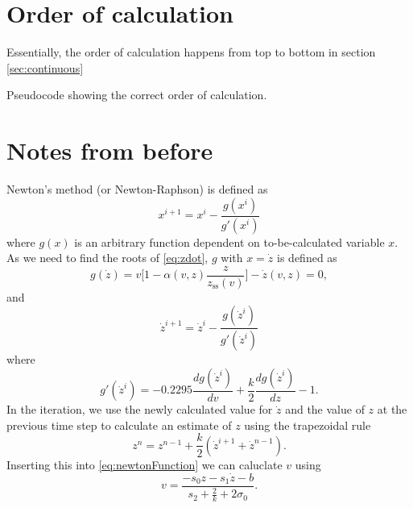 \documentclass{article}
\begin{document}
\section{Order of calculation}
Essentially, the order of calculation happens from top to bottom in section \ref{sec:continuous}
\begin{algorithm}[h]\label{alg:calcOrder}
 \caption{Pseudocode showing the correct order of calculation.}
\end{algorithm}

\section{Notes from before}
Newton's method (or Newton-Raphson) is defined as
\begin{equation}
    x^{i+1} = x^{i} - \frac{g(x^i)}{g'(x^i)}
\end{equation}
where $g(x)$ is an arbitrary function dependent on to-be-calculated variable $x$.
As we need to find the roots of \eqref{eq:zdot}, $g$ with $x=\dot z$ is defined as
\begin{equation}
   g(\dot z) = v\bigg[1-\alpha(v, z)\frac{z}{z_\text{ss}(v)}\bigg] -  \dot z(v,z) = 0,
\end{equation}
and
\begin{equation}
    \dot z^{i+1} = \dot z^i - \frac{g(\dot z^i)}{g'(\dot z^i)}
\end{equation}
where
\begin{equation}
    g'(\dot z^i) = -0.2295\frac{dg(\dot z^i)}{dv} + \frac{k}{2}\frac{dg(\dot z^i)}{dz} - 1.
\end{equation}
In the iteration, we use the newly calculated value for $\dot z$ and the value of $z$ at the previous time step to calculate an estimate of $z$ using the trapezoidal rule
\begin{equation}
    z^n = z^{n-1} + \frac{k}{2}(\dot z^{i+1} + \dot z^{n-1}).
\end{equation}
Inserting this into \eqref{eq:newtonFunction} we can caluclate $v$ using
\begin{equation}
    v = \frac{-s_0z-s_1\dot z-b}{s_2 + \frac{2}{k} + 2\sigma_0}.
\end{equation}
\end{document}
